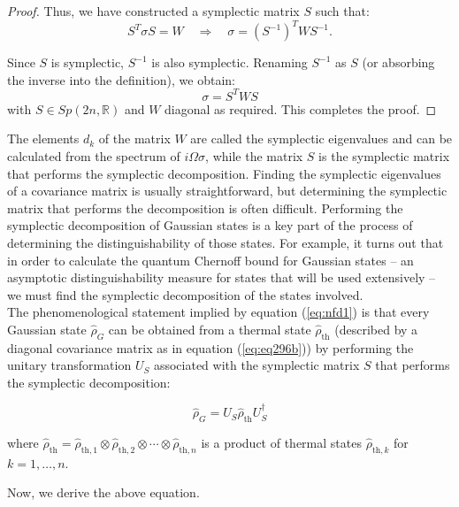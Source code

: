 \begin{proof}
Thus, we have constructed a symplectic matrix $S$ such that:
\begin{equation}
    S^T \sigma S = W \quad \Rightarrow \quad \sigma = (S^{-1})^T W S^{-1}.
\end{equation}

Since $S$ is symplectic, $S^{-1}$ is also symplectic. Renaming $S^{-1}$ as $S$ (or absorbing the inverse into the definition), we obtain:
\begin{equation}
    \sigma = S^T W S
\end{equation}
with $S \in Sp(2n, \mathbb{R})$ and $W$ diagonal as required. This completes the proof.
\end{proof}


The elements $d_k$ of the matrix $W$ are called the symplectic eigenvalues and can be calculated from the spectrum of $i\Omega\sigma$, while the matrix $S$ is the symplectic matrix that performs the symplectic decomposition. Finding the symplectic eigenvalues of a covariance matrix is usually straightforward, but determining the symplectic matrix that performs the decomposition is often difficult. Performing the symplectic decomposition of Gaussian states is a key part of the process of determining the distinguishability of those states. For example, it turns out that in order to calculate the quantum Chernoff bound for Gaussian states -- an asymptotic distinguishability measure for states that will be used extensively -- we must find the symplectic decomposition of the states involved.\\

The phenomenological statement implied by equation (\ref{eq:nfd1}) is that every Gaussian state $\hat{\rho}_G$ can be obtained from a thermal state $\hat{\rho}_{\text{th}}$ (described by a diagonal covariance matrix as in equation (\ref{eq:eq296b})) by performing the unitary transformation $U_S$ associated with the symplectic matrix $S$ that performs the symplectic decomposition:

\begin{equation}
    \hat{\rho}_G = U_S \hat{\rho}_{\text{th}} U_S^\dagger
\end{equation}

where $\hat{\rho}_{\text{th}} = \hat{\rho}_{\text{th},1} \otimes \hat{\rho}_{\text{th},2} \otimes \cdots \otimes \hat{\rho}_{\text{th},n}$ is a product of thermal states $\hat{\rho}_{\text{th},k}$ for $k = 1, \ldots, n$.

Now, we derive the above equation.\\

